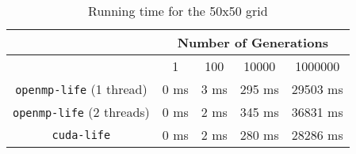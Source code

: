 \begin{table}[H]
\caption{Running time for the 50x50 grid}
	\begin{tabular}{c|c|c|c|c|}
	& \multicolumn{4}{c}{\bf Number of Generations} \\ \hline
				& 1 & 100 & 10000 & 1000000 \\ \hline
	{\tt openmp-life} (1 thread)& 0 ms & 3 ms & 295 ms & 29503 ms \\ \hline
	{\tt openmp-life} (2 threads)& 0 ms & 2 ms & 345 ms & 36831 ms \\ \hline
	{\tt cuda-life}   & 0 ms & 2 ms & 280 ms  &  28286 ms    \\ \hline
	\end{tabular}
\end{table}
